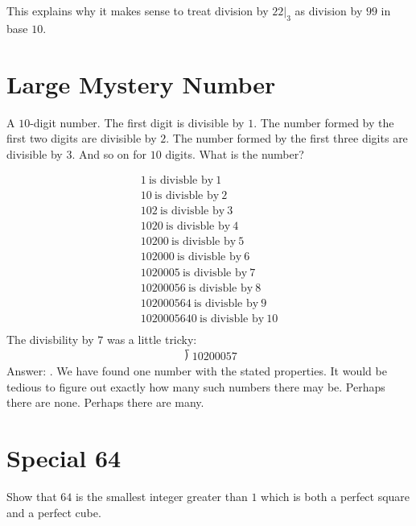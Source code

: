 \documentclass[12pt]{article}
\begin{document}
This explains why it makes sense to treat division by $22|_{3}$ as division by $99$ in base $10$.

\section*{Large Mystery Number}
A $10$-digit number. The first digit is divisible by $1$. The number formed by the first two digits are divisible by $2$. The number formed by the first three digits are divisible by $3$. And so on for $10$ digits. What is the number?

\begin{answer}
\begin{align*}
1 ~\text{is divisble by}~1 \\
10 ~\text{is divisble by}~2 \\
102 ~\text{is divisble by}~3 \\
1020 ~\text{is divisble by}~4 \\
10200 ~\text{is divisble by}~5 \\
102000 ~\text{is divisble by}~6 \\
1020005 ~\text{is divisble by}~7 \\
10200056 ~\text{is divisble by}~8 \\
102000564 ~\text{is divisble by}~9 \\
1020005640 ~\text{is divisble by}~10 \\
\end{align*}
The divisbility by $7$ was a little tricky:
\begin{align*}
\longdivision{1020005}{7}
\end{align*}
Answer: .  We have found one number with the stated properties. It would be tedious to figure out exactly how many such numbers there may be. Perhaps there are none. Perhaps there are many.
\end{answer}


\section*{Special 64}
Show that $64$ is the smallest integer greater than $1$ which is both a perfect square and a perfect cube.  
\end{document}
